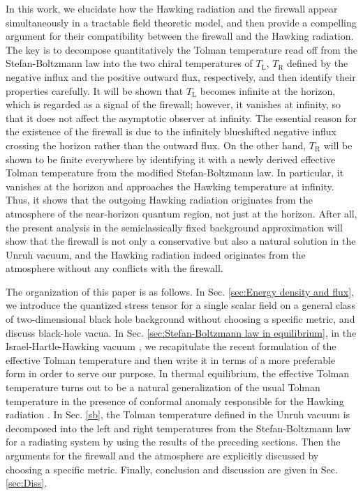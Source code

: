 \documentclass[aps,preprint,a4paper,showpacs,showkeys,superscriptaddress]{revtex4-1}
\begin{document}
In this work, we elucidate how the Hawking radiation and the firewall appear
simultaneously in a tractable field theoretic model,
and then provide a compelling argument for their compatibility between
the firewall and the Hawking radiation.
The key is to decompose quantitatively the Tolman temperature
read off from the Stefan-Boltzmann law
into the two chiral temperatures of $T_\text{L}$, $T_\text{R}$
defined by the negative influx and the positive outward flux, respectively, and then identify
their properties carefully.
It will be shown that $T_\text{L}$ becomes infinite at the horizon, which is regarded as a signal of the
firewall; however, it vanishes at infinity, so that it does not affect the asymptotic observer at infinity.
The essential reason for the existence of the firewall is
due to the infinitely blueshifted negative influx crossing the horizon
rather than the outward flux.
On the other hand, $T_\text{R}$ will be shown to be finite everywhere by identifying it
with a newly derived effective Tolman temperature from the modified Stefan-Boltzmann law.
In particular, it vanishes at the horizon and approaches the Hawking temperature
at infinity. Thus, it shows that the
outgoing Hawking radiation originates from the atmosphere of the near-horizon quantum region,
not just at the horizon.
After all, the present analysis in the semiclassically fixed background approximation will show
that the firewall is not only a conservative but also a natural solution in the Unruh vacuum,
and the Hawking radiation indeed originates from the atmosphere without any conflicts with the firewall.

The organization of this paper is as follows.
In Sec. \ref{sec:Energy density and flux},
we introduce the quantized stress tensor for a single scalar field
on a general class of two-dimensional black hole background without choosing a specific metric,
and discuss black-hole vacua.
In Sec. \ref{sec:Stefan-Boltzmann law in equilibrium},
in the Israel-Hartle-Hawking vacuum \cite{Hartle:1976tp,Israel:1976ur},
we recapitulate the recent formulation of the effective Tolman temperature \cite{Gim:2015era}
and then write it in terms of a more preferable form in order to serve our purpose.
In thermal equilibrium, the effective Tolman temperature turns out to be a natural generalization
of the usual Tolman temperature in the presence of
conformal anomaly \cite{Deser:1976yx} responsible for the Hawking radiation \cite{Christensen:1977jc}.
In Sec. \ref{sb}, the
Tolman temperature defined in the Unruh vacuum is decomposed into the left and right temperatures
from the Stefan-Boltzmann law for a radiating system by using the results of the preceding sections.
Then the arguments for the firewall and the atmosphere
are explicitly discussed by choosing a specific
metric. Finally, conclusion and discussion are given in Sec. \ref{sec:Diss}.
\end{document}
